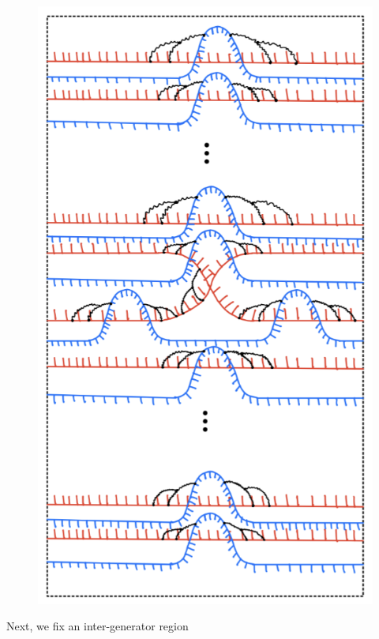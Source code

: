 \begin{definition}
\begin{figure}[H] 
    \centering
    \includegraphics[scale = 0.55]{diagrams/local_systems_on_as_diagrams/13.png}
    \caption{}
    \label{fig:your-label}
\end{figure}
\end{definition}
Next, we fix an inter-generator region
